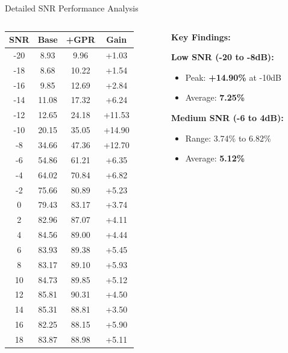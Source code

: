 \documentclass[aspectratio=169]{beamer}
\begin{document}
\begin{frame}{Detailed SNR Performance Analysis}
\begin{columns}
\begin{column}{0.5\textwidth}
\centering
\tiny
\begin{tabular}{@{}cccc@{}}
\toprule
\textbf{SNR} & \textbf{Base} & \textbf{+GPR} & \textbf{Gain} \\
\midrule
-20 & 8.93 & 9.96 & +1.03 \\
-18 & 8.68 & 10.22 & +1.54 \\
-16 & 9.85 & 12.69 & +2.84 \\
-14 & 11.08 & 17.32 & +6.24 \\
-12 & 12.65 & 24.18 & +11.53 \\
-10 & 20.15 & 35.05 & +14.90 \\
-8 & 34.66 & 47.36 & +12.70 \\
-6 & 54.86 & 61.21 & +6.35 \\
-4 & 64.02 & 70.84 & +6.82 \\
-2 & 75.66 & 80.89 & +5.23 \\
0 & 79.43 & 83.17 & +3.74 \\
2 & 82.96 & 87.07 & +4.11 \\
4 & 84.56 & 89.00 & +4.44 \\
6 & 83.93 & 89.38 & +5.45 \\
8 & 83.17 & 89.10 & +5.93 \\
10 & 84.73 & 89.85 & +5.12 \\
12 & 85.81 & 90.31 & +4.50 \\
14 & 85.31 & 88.81 & +3.50 \\
16 & 82.25 & 88.15 & +5.90 \\
18 & 83.87 & 88.98 & +5.11 \\
\bottomrule
\end{tabular}
\end{column}
\begin{column}{0.5\textwidth}
\textbf{Key Findings:}

\vspace{0.2cm}

\textbf{\textcolor{zjutred}{Low SNR (-20 to -8dB):}}
\begin{itemize}
\footnotesize
\setlength{\itemsep}{0pt}
\item Peak: \textbf{+14.90\%} at -10dB
\item Average: \textbf{7.25\%}
\end{itemize}

\textbf{\textcolor{zjutblue}{Medium SNR (-6 to 4dB):}}
\begin{itemize}
\footnotesize
\setlength{\itemsep}{0pt}
\item Range: 3.74\% to 6.82\%
\item Average: \textbf{5.12\%}
\end{itemize}


\end{column}
\end{columns}
\end{frame}
\end{document}

